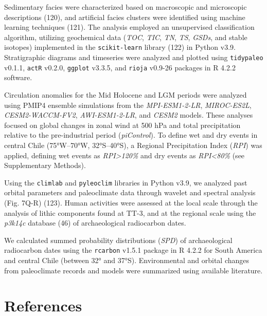 \documentclass[
]{article}
\begin{document}
Sedimentary facies were characterized based on macroscopic and
microscopic descriptions (120), and artificial facies clusters were
identified using machine learning techniques (121). The analysis
employed an unsupervised classification algorithm, utilizing geochemical
data (\emph{TOC}, \emph{TIC}, \emph{TN}, \emph{TS}, \emph{GSDs}, and
stable isotopes) implemented in the \texttt{scikit-learn} library (122)
in Python v3.9. Stratigraphic diagrams and timeseries were analyzed and
plotted using \texttt{tidypaleo} v0.1.1, \texttt{actR} v0.2.0,
\texttt{ggplot} v3.3.5, and \texttt{rioja} v0.9-26 packages in R 4.2.2
software.

Circulation anomalies for the Mid Holocene and LGM periods were analyzed
using PMIP4 ensemble simulations from the \emph{MPI-ESM1-2-LR},
\emph{MIROC-ES2L}, \emph{CESM2-WACCM-FV2}, \emph{AWI-ESM1-2-LR}, and
\emph{CESM2} models. These analyses focused on global changes in zonal
wind at 500 hPa and total precipitation relative to the pre-industrial
period (\emph{piControl}). To define wet and dry events in central Chile
(75°W--70°W, 32°S--40°S), a Regional Precipitation Index (\emph{RPI})
was applied, defining wet events as \emph{RPI\textgreater120\%} and dry
events as \emph{RPI\textless80\%} (see Supplementary Methods).

Using the \texttt{climlab} and \texttt{pyleoclim} libraries in Python
v3.9, we analyzed past orbital parameters and paleoclimate data through
wavelet and spectral analysis (Fig. 7Q-R) (123). Human activities were
assessed at the local scale through the analysis of lithic components
found at TT-3, and at the regional scale using the \emph{p3k14c}
database (46) of archaeological radiocarbon dates.

We calculated summed probability distributions (\emph{SPD}) of
archaeological radiocarbon dates using the \texttt{rcarbon} v1.5.1
package in R 4.2.2 for South America and central Chile (between 32° and
37°S). Environmental and orbital changes from paleoclimate records and
models were summarized using available literature.

\section{References}\label{references}
\end{document}
